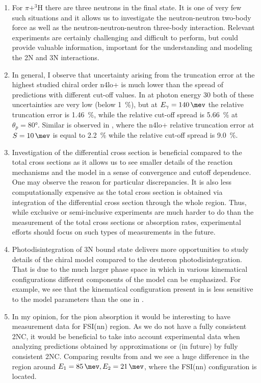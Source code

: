 \begin{enumerate}
    \item For $\pi + ^3$H there are three neutrons in the final state. It is one of very few such situations and it allows us to investigate the
    neutron-neutron two-body force as well as the neutron-neutron-neutron three-body interaction. 
    Relevant  experiments are certainly challenging and difficult to perform, but
    could provide valuable information, important for the understanding and modeling
    the 2N and 3N interactions.
    \item In general, I observe that uncertainty arising from the truncation error at the highest
    studied chiral order \gls{n4lo+} is much lower than the spread of predictions with different
    cut-off values. In  at photon energy \SI{30}{\mev} both of these
    uncertainties are very low (below \SI{1}{\percent}), but at $E_\gamma=\SI{140}{\mev}$
    the relative truncation error is \SI{1.46}{\percent}, while the relative cut-off spread is 
    \SI{5.66}{\percent} at $\theta_p= \ang{80}$.
    Similar is observed in , where the \gls{n4lo+} relative 
    truncation error at $S=\SI{10}{\mev}$ is equal to \SI{2.2}{\percent} while
    the relative cut-off spread is \SI{9.0}{\percent}.
    \item Investigation of the differential cross section is beneficial compared to the total cross sections as it allows us to see smaller details of the reaction mechanisms and the model in a sense of convergence and cutoff dependence. One may observe the reason for particular discrepancies.
    It is also less computationally expensive as the total cross section is obtained via integration of the differential cross section through the whole region.
    Thus, while exclusive or semi-inclusive experiments are much harder to do than the measurement of the total
    cross sections or absorption rates, experimental efforts should focus on such types of measurements in the future. 
    \item  Photodisintegration of 3N bound state delivers more opportunities to study details of the chiral model compared to the deuteron photodisintegration.
    That is due to the much larger phase space in which in various kinematical configurations different components of the model can be emphasized. For example, we see that the kinematical configuration present in  is less sensitive to the model parameters than the one in .
    \item In my opinion, for the pion absorption it would be interesting to have measurement data for FSI(nn) region. As we do not have a fully consistent 2NC, it would be beneficial to take into account experimental data when analyzing predictions obtained by approximations or (in future) by fully consistent 2NC. Comparing results from   and  we see a huge difference in the region around $E_1=\SI{85}{\mev}, E_2 = \SI{21}{\mev}$, where the FSI(nn) configuration is located.

\end{enumerate}
